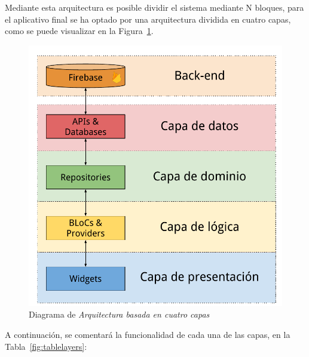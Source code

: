 Mediante esta arquitectura es posible dividir el sistema mediante N bloques, para el aplicativo final se ha optado por una
arquitectura dividida en cuatro capas, como se puede visualizar en la Figura~\ref{fig:architecture1}.

\begin{figure}[H]
  \centering
  \includegraphics[scale=0.7]{images/architecture.pdf}
  \caption{Diagrama de \textit{Arquitectura basada en cuatro capas}}
  \label{fig:architecture1}
\end{figure}

A continuación, se comentará la funcionalidad de cada una de las capas, en la Tabla~\ref{fig:tablelayers}:

